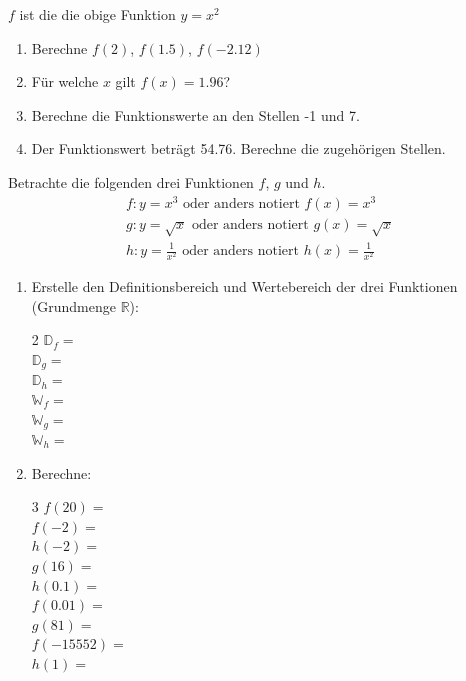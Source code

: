 \documentclass[11pt,oneside]{article}
\begin{document}
	\begin{aufgabe}
		$f$ ist die die obige Funktion $y=x^2$
		\begin{enumerate}[label=\alph*)]
			\item Berechne $f(2)$, $f(1.5)$, $f(-2.12)$
			\item Für welche $x$ gilt $f(x)=1.96$?
			\item Berechne die Funktionswerte an den Stellen -1 und 7.
			\item Der Funktionswert beträgt 54.76. Berechne die zugehörigen Stellen.
		\end{enumerate}
	\end{aufgabe}
	\begin{aufgabe}
		Betrachte die folgenden drei Funktionen $f$, $g$ und $h$.\vspace{-0.25cm}
		\begin{align*}
			f: y=x^3 \text{ oder anders notiert } f(x)=x^3 \\
			g: y=\sqrt{x}\text{ oder anders notiert } g(x)=\sqrt{x}\\
			h: y=\frac{1}{x^2}\text{ oder anders notiert } h(x)=\frac{1}{x^2}
		\end{align*}
		\begin{enumerate}[label=\alph*)]
			\item Erstelle den Definitionsbereich und Wertebereich der drei Funktionen (Grundmenge $ \mathbb{R}$):
			\begin{multicols}{2}
				$\mathbb{D}_f=$\\
				$\mathbb{D}_g=$\\
				$\mathbb{D}_h=$\\
				$\mathbb{W}_f=$\\
				$\mathbb{W}_g=$\\
				$\mathbb{W}_h=$
			\end{multicols}
			\item Berechne:
			\begin{multicols}{3}
				$f(20)=$\\
				$f(-2)=$\\
				$h(-2)=$\\
				$g(16)=$\\
				$h(0.1)=$\\
				$f(0.01)=$\\
				$g(81)=$\\
				$f(-15552)=$\\
				$h(1)=$
			\end{multicols}
		\end{enumerate}
	\end{aufgabe}
\end{document}
